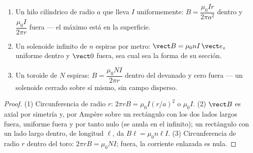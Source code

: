 \begin{proposition}\label{prop:b1:magnetostatics:ampereapps}
\begin{enumerate}
  \item Un hilo cilíndrico de radio $a$ que lleva $I$ uniformemente:
        $B = \dfrac{\mu_0Ir}{2\pi a^2}$ dentro y $\dfrac{\mu_0I}{2\pi r}$ fuera
        --- el máximo está en la superficie.
  \item Un solenoide infinito de $n$ espiras por metro: $\vect B = \mu_0nI\,
        \vect e_z$ uniforme dentro y $\vect 0$ fuera, sea cual sea la forma
        de su sección.
  \item Un toroide de $N$ espiras: $B = \dfrac{\mu_0NI}{2\pi r}$ dentro del
        devanado y cero fuera --- un solenoide cerrado sobre sí mismo, sin
        campo disperso.
\end{enumerate}
\end{proposition}

\begin{proof}
(1) Circunferencia de radio $r$: $2\pi rB = \mu_0I(r/a)^2$ o $\mu_0I$. (2) $\vect B$
es axial por simetría y, por Ampère sobre un rectángulo con los dos lados
largos fuera, uniforme fuera y por tanto nulo (se anula en el infinito);
un rectángulo con un lado largo dentro, de longitud $\ell$, da $B\ell =
\mu_0n\ell I$. (3) Circunferencia de radio $r$ dentro del toro: $2\pi rB =
\mu_0NI$; fuera, la corriente enlazada es nula.
\end{proof}

